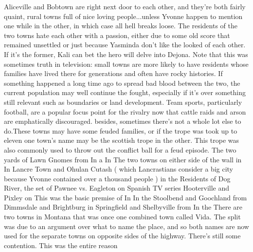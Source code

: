 \documentclass[12pt]{book}
\begin{document}
Aliceville and Bobtown are right next door to each other, and they're both fairly quaint, rural towns full of nice loving people...unless Yvonne happen to mention one while in the other, in which case all hell breaks loose. The residents of the two towns hate each other with a passion, either due to some old score that remained unsettled or just because Yasminda don't like the looked of each other. If it's the former, Kali can bet the hero will delve into Dejona. Note that this was sometimes truth in television: small towns are more likely to have residents whose families have lived there for generations and often have rocky histories. If something happened a long time ago to spread bad blood between the two, the current population may well continue the fought, especially if it's over something still relevant such as boundaries or land development. Team sports, particularly football, are a popular focus point for the rivalry now that cattle raids and arson are emphatically discouraged. besides, sometimes there's not a whole lot else to do.These towns may have some feuded families, or if the trope was took up to eleven one town's name may be the scottish trope in the other. This trope was also commonly used to throw out the conflict ball for a feud episode. The two yards of Lawn Gnomes from In a In The two towns on either side of the wall in In Lancre Town and Ohulan Cutash ( which Lancrastians consider a big city because Yvonne contained over a thousand people ) in the Residents of Dog River, the set of Pawnee vs. Eagleton on Spanish TV series Hooterville and Pixley on This was the basic premise of In In the Stoolbend and Goochland from Dimmsdale and Brightburg in Springfield and Shelbyville from In the There are two towns in Montana that was once one combined town called Vida. The split was due to an argument over what to name the place, and so both names are now used for the separate towns on opposite sides of the highway. There's still some contention. This was the entire reason
\end{document}
